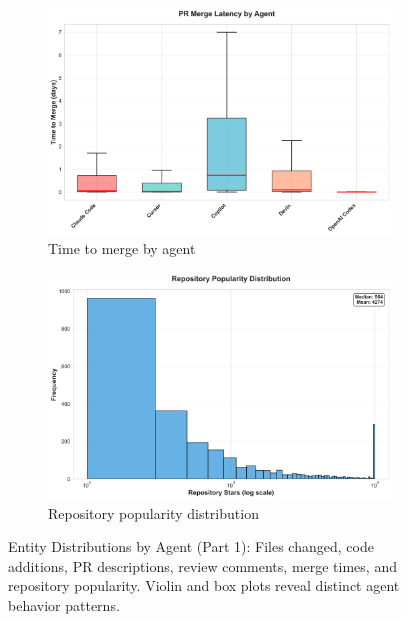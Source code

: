 \documentclass[11pt]{article}
\begin{document}
\begin{figure}[H]
\begin{subfigure}[b]{0.48\textwidth}
\centering
\includegraphics[width=\textwidth]{figures_individual/35_entity_time_to_merge_by_agent.png}
\caption{Time to merge by agent}
\label{fig:entity_merge_time}
\end{subfigure}
\hfill
\begin{subfigure}[b]{0.48\textwidth}
\centering
\includegraphics[width=\textwidth]{figures_individual/36_entity_repository_popularity.png}
\caption{Repository popularity distribution}
\label{fig:entity_repo_pop}
\end{subfigure}

\caption{Entity Distributions by Agent (Part 1): Files changed, code additions, PR descriptions, review comments, merge times, and repository popularity. Violin and box plots reveal distinct agent behavior patterns.}
\label{fig:entity_dist_part1}
\end{figure}
\end{document}

